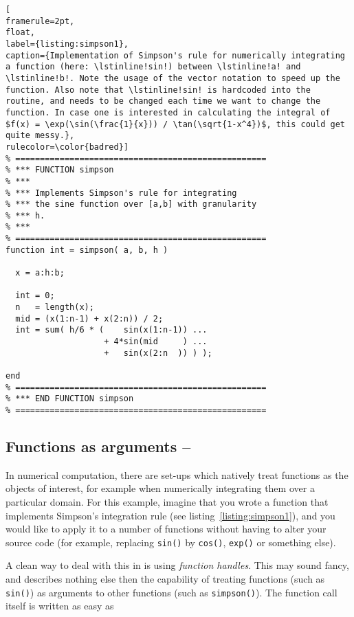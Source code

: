 \begin{lstlisting}[
framerule=2pt,
float,
label={listing:simpson1},
caption={Implementation of Simpson's rule for numerically integrating a function (here: \lstinline!sin!) between \lstinline!a! and \lstinline!b!. Note the usage of the vector notation to speed up the function. Also note that \lstinline!sin! is hardcoded into the routine, and needs to be changed each time we want to change the function. In case one is interested in calculating the integral of $f(x) = \exp(\sin(\frac{1}{x})) / \tan(\sqrt{1-x^4})$, this could get quite messy.},
rulecolor=\color{badred}]
% ===================================================
% *** FUNCTION simpson
% ***
% *** Implements Simpson's rule for integrating
% *** the sine function over [a,b] with granularity
% *** h.
% ***
% ===================================================
function int = simpson( a, b, h )

  x = a:h:b;

  int = 0;
  n   = length(x);
  mid = (x(1:n-1) + x(2:n)) / 2;
  int = sum( h/6 * (    sin(x(1:n-1)) ...
                    + 4*sin(mid     ) ...
                    +   sin(x(2:n  )) ) );

end
% ===================================================
% *** END FUNCTION simpson
% ===================================================
\end{lstlisting}

\subsection{Functions as arguments -- \cleansymbol\cleansymbol\cleansymbol}

In numerical computation, there are set-ups which natively treat functions as
the objects of interest, for example when numerically integrating them over a
particular domain. For this example, imagine that you wrote a function that
implements Simpson's integration rule (see listing~\ref{listing:simpson1}),
and you would like to apply it to a number of functions without having to
alter your source code (for example, replacing \lstinline!sin()! by
\lstinline!cos()!, \lstinline!exp()! or something else).

A clean way to deal with this in \matlab{} is using \emph{function handles}. This may sound fancy, and describes nothing else then the capability of treating functions (such as \lstinline!sin()!) as arguments to other functions (such as \lstinline!simpson()!). The function call itself is written as easy as

